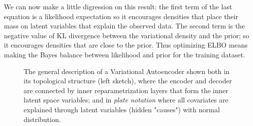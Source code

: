 We can now make a little digression on this result: the first term of the last equation is a likelihood expectation so it encourages densities that place their mass on latent variables that explain the observed data. The second term is the negative value of KL divergence between the variational density and the prior; so it encourages densities that are close to the prior. 
Thus optimizing \acs{ELBO} means making the Bayes balance between likelihood and prior for the training dataset.
%
\begin{figure}
    \centering
    \caption{ The general description of a Variational Autoencoder shown both in its topological structure (left sketch), where the encoder and decoder are connected by inner reparametrization layers that form the inner latent space variables; and in \textit{plate notation} where all covariates are explained through latent variables (hidden "causes") with normal distribution. }
    \label{fig:step_1_VAE}
\end{figure}










%


